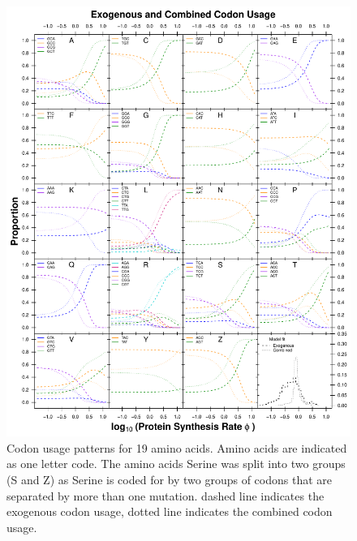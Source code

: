 \documentclass[fleqn,letterpaper]{article}
\begin{document}
\begin{figure}
     \centering
	\includegraphics[width=\textwidth]{img/CUB_full_cleft.pdf}
	\caption{Codon usage patterns for 19 amino acids. Amino acids are indicated as one letter code. 
	The amino acids Serine was split into two groups (S and Z) as Serine is coded for by two groups of codons that are separated by more than one mutation.
	dashed line indicates the exogenous codon usage, dotted line indicates the combined codon usage.}
	\label{fig:cub_full_cleft}
\end{figure}
\end{document}
